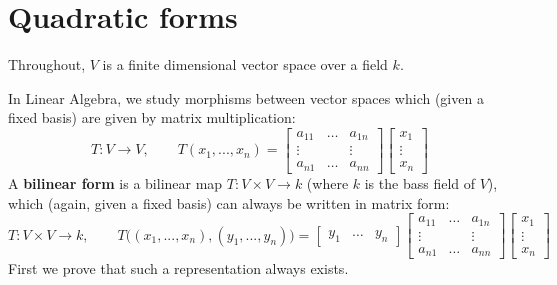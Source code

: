 \documentclass[12pt]{article}
\theoremstyle{plain}
\theoremstyle{definition}
\newcommand{\lto}{\longrightarrow}
\begin{document}
\section{Quadratic forms}
Throughout, $V$ is a finite dimensional vector space over a field $k$.

In Linear Algebra, we study morphisms between vector spaces which (given a fixed basis) are given by matrix multiplication:
\begin{equation}
T: V \lto V,\qquad T(x_1,...,x_n) = 
    \begin{bmatrix}
    a_{11} & \hdots & a_{1n}\\
    \vdots& & \vdots\\
    a_{n1} & \hdots & a_{nn}
    \end{bmatrix}
    \begin{bmatrix}
    x_1\\
    \vdots\\
    x_n
    \end{bmatrix}
\end{equation}
A \textbf{bilinear form} is a bilinear map $T: V \times V \lto k$ (where $k$ is the bass field of $V$), which (again, given a fixed basis) can always be written in matrix form:
\begin{equation}
    T: V \times V \lto k,\qquad T\big((x_1,...,x_n),(y_1,...,y_n)\big) =
    \begin{bmatrix}
    y_1 & \hdots & y_n
    \end{bmatrix}
    \begin{bmatrix}
    a_{11} & \hdots & a_{1n}\\
    \vdots & & \vdots\\
    a_{n1} & \hdots & a_{nn}
    \end{bmatrix}
    \begin{bmatrix}
    x_1\\
    \vdots\\
    x_n
    \end{bmatrix}
\end{equation}
First we prove that such a representation always exists.
\end{document}
